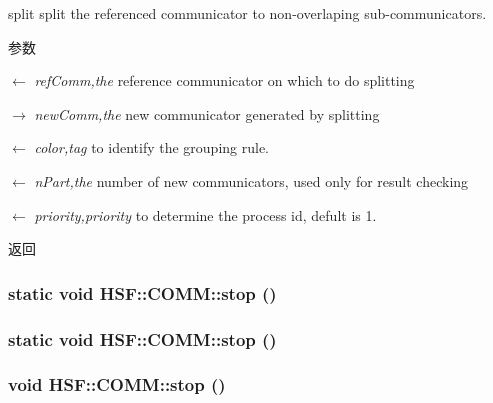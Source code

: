 split split the referenced communicator to non-\/overlaping sub-\/communicators. 
\begin{DoxyParams}{参数}
\item[\mbox{$\leftarrow$} {\em refComm,the}]reference communicator on which to do splitting \item[\mbox{$\rightarrow$} {\em newComm,the}]new communicator generated by splitting \item[\mbox{$\leftarrow$} {\em color,tag}]to identify the grouping rule. \item[\mbox{$\leftarrow$} {\em nPart,the}]number of new communicators, used only for result checking \item[\mbox{$\leftarrow$} {\em priority,priority}]to determine the process id, defult is 1. \end{DoxyParams}
\begin{DoxyReturn}{返回}

\end{DoxyReturn}
\hypertarget{classHSF_1_1COMM_a4e6c81ad1d5471ea0b9cf1ff00afb041}{
\subsubsection[{stop}]{\setlength{\rightskip}{0pt plus 5cm}static void HSF::COMM::stop ()}}
\label{classHSF_1_1COMM_a4e6c81ad1d5471ea0b9cf1ff00afb041}
\hypertarget{classHSF_1_1COMM_a4e6c81ad1d5471ea0b9cf1ff00afb041}{
\subsubsection[{stop}]{\setlength{\rightskip}{0pt plus 5cm}static void HSF::COMM::stop ()}}
\label{classHSF_1_1COMM_a4e6c81ad1d5471ea0b9cf1ff00afb041}
\hypertarget{classHSF_1_1COMM_a90b5eb0d97e94e3eb00e534d7817f67e}{
\subsubsection[{stop}]{\setlength{\rightskip}{0pt plus 5cm}void HSF::COMM::stop ()}}
\label{classHSF_1_1COMM_a90b5eb0d97e94e3eb00e534d7817f67e}


